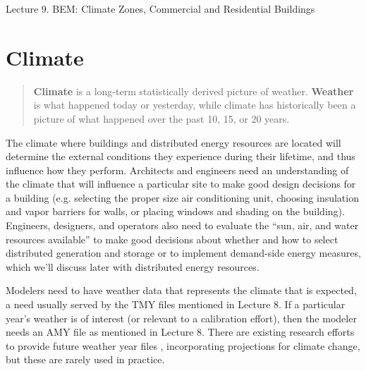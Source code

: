 \documentclass[10pt]{article}
\begin{document}
   \noindent
   \begin{center}

   \hrulefill
   
   \vspace{5pt}
   
   \vspace{0pt}
   
   {\Large \hfill  Lecture 9. BEM: Climate Zones, Commercial  and Residential Buildings}
   \vspace{5pt}
   
  
   \hrulefill
   \end{center}

{}

\section{Climate}

\begin{quote}
\textbf{Climate} is a long-term statistically derived picture of weather. \textbf{Weather} is what happened today or yesterday, while climate has historically been a picture of what happened over the past 10, 15, or 20 years. \cite{Grondzik2014-gt}
\end{quote}

The climate where buildings and distributed energy resources are located will determine the external conditions they experience during their lifetime, and thus influence how they perform. Architects and engineers need an understanding of the climate that will influence a particular site to make good design decisions for a building (e.g. selecting the proper size air conditioning unit, choosing insulation and vapor barriers for walls, or placing windows and shading on the building). Engineers, designers, and operators also need to evaluate the ``sun, air, and water resources available'' to make good decisions about whether and how to select distributed generation and storage or to implement demand-side energy measures, which we'll discuss later with distributed energy resources.

Modelers need to have weather data that represents the climate that is expected, a need usually served by the TMY files mentioned in Lecture 8. If a particular year's weather is of interest (or relevant to a calibration effort), then the modeler needs an AMY file as mentioned in Lecture 8. There are existing research efforts to provide future weather year files \cite{C_Bianchi_DL_Mendoza_RC_Didier_TD_Tran_AD_Smith2017-uk}, incorporating projections for climate change, but these are rarely used in practice.
\end{document}
